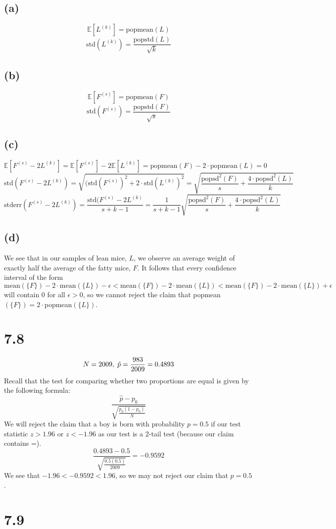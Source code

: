 \documentclass[11pt]{article}
\begin{document}
\subsection*{(a)}
\[\mathbb{E}[L^{(k)}]=\text{popmean}(L)\]
\[\text{std}(L^{(k)})=\frac{\text{popstd}(L)}{\sqrt{k}}\]
\subsection*{(b)}
\[\mathbb{E}[F^{(s)}]=\text{popmean}(F)\]
\[\text{std}(F^{(s)})=\frac{\text{popstd}(F)}{\sqrt{s}}\]
\subsection*{(c)}
\[\mathbb{E}[F^{(s)}-2L^{(k)}]=\mathbb{E}[F^{(s)}]-2\mathbb{E}[L^{(k)}]=\text{popmean}(F)-2\cdot\text{popmean}(L)=0\]  
\[\text{std}(F^{(s)}-2L^{(k)})=\sqrt{(\text{std}(F^{(s)})^2+2\cdot\text{std}(L^{(k)})^2}=\sqrt{\frac{\text{popsd}^2(F)}{s}+\frac{4\cdot\text{popsd}^2(L)}{k}}\]
\[\text{stderr}(F^{(s)}-2L^{(k)})=\frac{\text{std}(F^{(s)}-2L^{(k)}}{s+k-1}=\frac{1}{s+k-1}\sqrt{\frac{\text{popsd}^2(F)}{s}+\frac{4\cdot\text{popsd}^2(L)}{k}}\]
\subsection*{(d)}
We see that in our samples of lean mice, $L$, we observe an average weight of exactly half the average of the fatty mice, $F$. It follows that every confidence interval of the form
\[\text{mean}(\{F\})-2\cdot\text{mean}(\{L\})-\epsilon<\text{mean}(\{F\})-2\cdot\text{mean}(\{L\})<\text{mean}(\{F\})-2\cdot\text{mean}(\{L\})+\epsilon\]
will contain 0 for all $\epsilon>0$, so we cannot reject the claim that popmean$(\{F\})=2\cdot$popmean$(\{L\})$.
\section*{7.8}
\[N=2009,\hspace{1mm}\hat{p}=\frac{983}{2009}=0.4893\]
Recall that the test for comparing whether two proportions are equal is given by the following formula:
\[\frac{\hat{p}-p_0}{\sqrt{\frac{p_0(1-p_0)}{N}}}\]
We will reject the claim that a boy is born with probability $p=0.5$ if our test statistic $z>1.96$ or $z<-1.96$ as our test is a 2-tail test (because our claim contains =).
\[\frac{0.4893-0.5}{\sqrt{\frac{0.5(0.5)}{2009}}}=-0.9592\]
We see that $-1.96<-0.9592<1.96$, so we may not reject our claim that $p=0.5$.
\section*{7.9}
\end{document}
